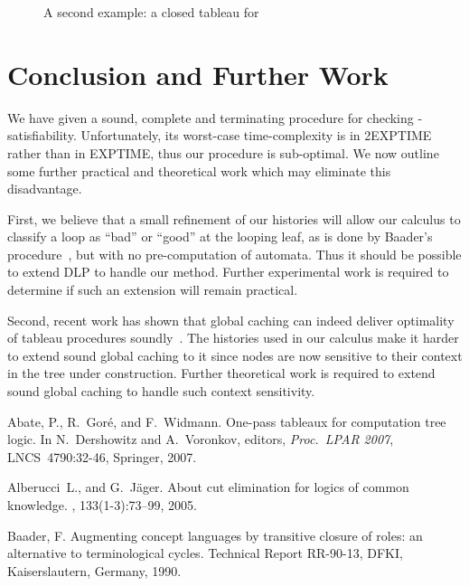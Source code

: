 \documentclass{entcs}
\newcommand{\pdl}{}
\begin{document}
\begin{center}
\begin{figure}
\begin{center}
  \end{center}
  \caption[]{A second example: a closed tableau for~}
  \label{fig_ex1}
\end{figure}

\section{Conclusion and Further Work}

We have given a sound, complete and terminating procedure
for checking \pdl{}-satisfiability.
Unfortunately, its worst-case time-complexity is in 2EXPTIME rather than in EXPTIME,
thus our procedure is sub-optimal.
We now outline some further practical and theoretical work
which may eliminate this disadvantage.

First, we believe that a small refinement of our histories will allow
our calculus to classify a loop as ``bad'' or ``good'' at the looping leaf,
as is done by Baader's procedure~\cite{baader-augmenting-transitive-closure},
but with no pre-computation of automata.
Thus it should be possible to extend DLP to handle our method.
Further experimental work is required to determine
if such an extension will remain practical.

Second, recent work has shown that global caching
can indeed deliver optimality of tableau procedures
soundly~\cite{gore-nguyen-exptime-alc}.
The histories used in our calculus make it harder to extend sound global caching to it
since nodes are now sensitive to their context in the tree under construction.
Further theoretical work is required
to extend sound global caching to handle such context sensitivity.


\begin{thebibliography}{10}

  Abate, P., R.~Gor{\'e}, and F.~Widmann.
  \newblock One-pass tableaux for computation tree logic.
  \newblock In N.~Dershowitz and A.~Voronkov, editors, {\em Proc.\
    LPAR 2007},  LNCS~4790:32-46, Springer, 2007.

Alberucci~L., and G.~J{\"a}ger.
  \newblock About cut elimination for logics of common knowledge.
  \newblock {\em Annal of Pure and Applied Logic}, 133(1-3):73--99, 2005.

  Baader, F.
  \newblock Augmenting concept languages by transitive closure of roles: an
  alternative to terminological cycles.
  \newblock Technical Report RR-90-13, DFKI, Kaiserslautern, Germany, 1990.


\end{thebibliography}
\end{center}
\end{document}
